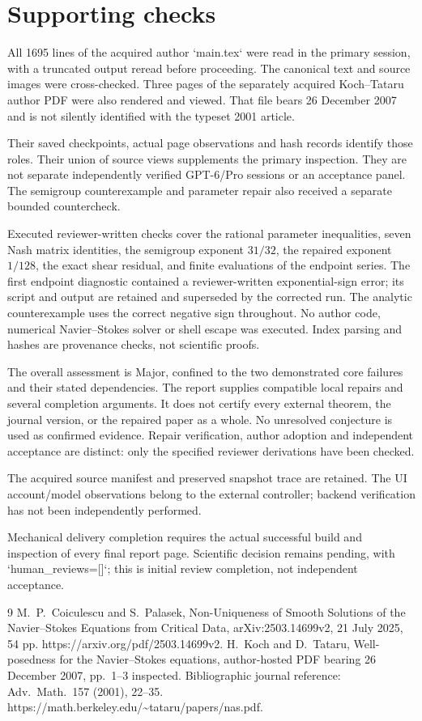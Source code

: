 \documentclass[10pt]{article}
\begin{document}
\section*{Supporting checks}
All 1695 lines of the acquired author `main.tex` were read in the primary session, with a truncated output reread before proceeding. The canonical text and source images were cross-checked. Three pages of the separately acquired Koch–Tataru author PDF were also rendered and viewed. That file bears 26 December 2007 and is not silently identified with the typeset 2001 article.\par
Their saved checkpoints, actual page observations and hash records identify those roles. Their union of source views supplements the primary inspection. They are not separate independently verified GPT-6/Pro sessions or an acceptance panel. The semigroup counterexample and parameter repair also received a separate bounded countercheck.\par
Executed reviewer-written checks cover the rational parameter inequalities, seven Nash matrix identities, the semigroup exponent \(31/32\), the repaired exponent \(1/128\), the exact shear residual, and finite evaluations of the endpoint series. The first endpoint diagnostic contained a reviewer-written exponential-sign error; its script and output are retained and superseded by the corrected run. The analytic counterexample uses the correct negative sign throughout. No author code, numerical Navier–Stokes solver or shell escape was executed. Index parsing and hashes are provenance checks, not scientific proofs.\par
The overall assessment is Major, confined to the two demonstrated core failures and their stated dependencies. The report supplies compatible local repairs and several completion arguments. It does not certify every external theorem, the journal version, or the repaired paper as a whole. No unresolved conjecture is used as confirmed evidence. Repair verification, author adoption and independent acceptance are distinct: only the specified reviewer derivations have been checked.\par
The acquired source manifest and preserved snapshot trace are retained. The UI account/model observations belong to the external controller; backend verification has not been independently performed.\par
Mechanical delivery completion requires the actual successful build and inspection of every final report page. Scientific decision remains pending, with `human\_reviews=[]`; this is initial review completion, not independent acceptance.\par
9 M. P. Coiculescu and S. Palasek, Non-Uniqueness of Smooth Solutions of the Navier–Stokes Equations from Critical Data, arXiv:2503.14699v2, 21 July 2025, 54 pp. https://arxiv.org/pdf/2503.14699v2. H. Koch and D. Tataru, Well-posedness for the Navier–Stokes equations, author-hosted PDF bearing 26 December 2007, pp. 1–3 inspected. Bibliographic journal reference: Adv. Math. 157 (2001), 22–35. https://math.berkeley.edu/\textasciitilde{}tataru/papers/nas.pdf.\par
\end{document}

